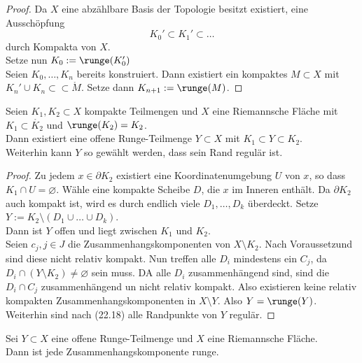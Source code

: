 \begin{proof}
  Da $X$ eine abzählbare Basis der Topologie besitzt existiert, eine
  Ausschöpfung
  \[
  K_0' \subset K_1' \subset \dots
  \]
  durch Kompakta von $X$. \\
  Setze nun $K_0 := \runge(K_0')$ \\
  Seien $K_0, \dots, K_n$ bereits konstruiert. Dann existiert ein
  kompaktes $M \subset X$ mit $K_n' \cup K_n \subset \subset \mathring
  M$. Setze dann $K_{n+1} := \runge(M)$.
\end{proof}

\begin{lemma}
  \label{lemma:zwischen-runge}
  Seien $K_1, K_2 \subset X$ kompakte Teilmengen und $X$ eine
  Riemannsche Fläche mit $K_1 \subset \mathring{K_2}$ und $\runge(K_2)
  = K_2$. \\
  Dann existiert eine offene Runge-Teilmenge $Y \subset X$ mit $K_1
  \subset Y \subset K_2$. \\
  Weiterhin kann $Y$ so gewählt werden, dass sein Rand regulär ist.
\end{lemma}

\begin{proof}
  Zu jedem $x \in \partial K_2$ existiert eine Koordinatenumgebung $U$
  von $x$, so dass $K_1 \cap U = \varnothing$. Wähle eine kompakte
  Scheibe $D$, die $x$ im Inneren enthält. Da $\partial K_2$ auch
  kompakt ist, wird es durch endlich viele $D_1, \dots, D_k$
  überdeckt. Setze $Y := K_2 \setminus (D_1 \cup \dots \cup D_k)$. \\
  Dann ist $Y$ offen und liegt zwischen $K_1$ und $K_2$. \\
  Seien $c_j, j \in J$ die Zusammenhangskomponenten von $X \setminus
  K_2$. Nach Voraussetzund sind diese nicht relativ kompakt. Nun
  treffen alle $D_i$ mindestens ein $C_j$, da $D_i \cap (Y \setminus
  K_2) \neq \varnothing$ sein muss. DA alle $D_i$ zusammenhängend
  sind, sind die $D_i \cap C_j$ zusammenhängend un nicht relativ
  kompakt. Also existieren keine relativ kompakten
  Zusammenhangskomponenten in $X\setminus Y$. Also $Y = \runge(Y)$. \\
  Weiterhin sind nach (22.18) alle Randpunkte von $Y$ regulär.
\end{proof}

\begin{thm}
  \label{thm:runge-zshkomp}
  Sei $Y \subset X$ eine offene Runge-Teilmenge und $X$ eine
  Riemannsche Fläche. \\
  Dann ist jede Zusammenhangskomponente runge.
\end{thm}

